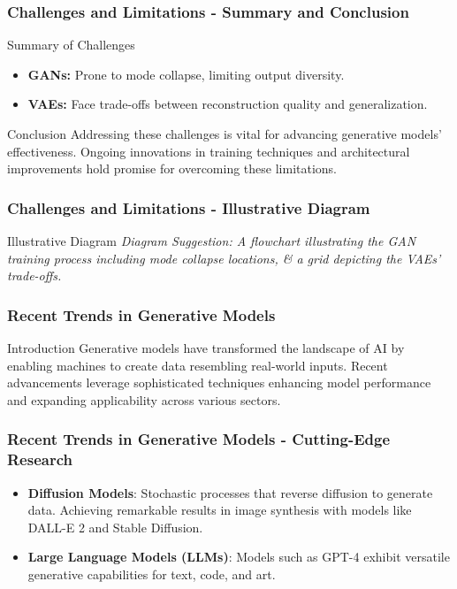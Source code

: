 \documentclass[aspectratio=169]{beamer}
\begin{document}
\begin{frame}[fragile]
    \frametitle{Challenges and Limitations - Summary and Conclusion}
    \begin{block}{Summary of Challenges}
        \begin{itemize}
            \item \textbf{GANs:} Prone to mode collapse, limiting output diversity.
            \item \textbf{VAEs:} Face trade-offs between reconstruction quality and generalization.
        \end{itemize}
    \end{block}

    \begin{block}{Conclusion}
        Addressing these challenges is vital for advancing generative models' effectiveness. Ongoing innovations in training techniques and architectural improvements hold promise for overcoming these limitations.
    \end{block}
\end{frame}

\begin{frame}[fragile]
    \frametitle{Challenges and Limitations - Illustrative Diagram}
    \begin{block}{Illustrative Diagram}
        \centering
        \textit{ Diagram Suggestion: A flowchart illustrating the GAN training process including mode collapse locations, \& a grid depicting the VAEs' trade-offs.}
    \end{block}
\end{frame}

\begin{frame}[fragile]
    \frametitle{Recent Trends in Generative Models}
    \begin{block}{Introduction}
        Generative models have transformed the landscape of AI by enabling machines to create data resembling real-world inputs. Recent advancements leverage sophisticated techniques enhancing model performance and expanding applicability across various sectors.
    \end{block}
\end{frame}

\begin{frame}[fragile]
    \frametitle{Recent Trends in Generative Models - Cutting-Edge Research}
    \begin{itemize}
        \item \textbf{Diffusion Models}: Stochastic processes that reverse diffusion to generate data. Achieving remarkable results in image synthesis with models like DALL-E 2 and Stable Diffusion.
        \item \textbf{Large Language Models (LLMs)}: Models such as GPT-4 exhibit versatile generative capabilities for text, code, and art.
    \end{itemize}
\end{frame}
\end{document}
